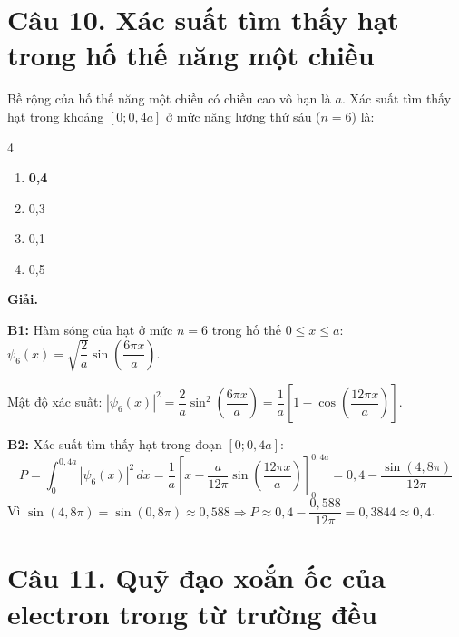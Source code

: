 \documentclass[11pt,a4paper]{article}
\begin{document}
\vspace{0.5cm}

\section*{Câu 10. Xác suất tìm thấy hạt trong hố thế năng một chiều}

Bề rộng của hố thế năng một chiều có chiều cao vô hạn là $a$. Xác suất tìm thấy hạt trong khoảng $[0; 0{,}4a]$ ở mức năng lượng thứ sáu ($n = 6$) là:

\begin{multicols}{4}
\begin{enumerate}[label=\Alph*., itemsep=1pt, topsep=1pt, parsep=0pt, leftmargin=1.8em]
    \item \textbf{0,4}
    \item 0,3
    \item 0,1
    \item 0,5
\end{enumerate}
\end{multicols}

\textbf{Giải.}

\textbf{B1:} Hàm sóng của hạt ở mức $n = 6$ trong hố thế $0 \le x \le a$: $\psi_6(x) = \sqrt{\dfrac{2}{a}} \sin\!\left(\dfrac{6\pi x}{a}\right)$.

Mật độ xác suất: $|\psi_6(x)|^2 = \dfrac{2}{a} \sin^2\!\left(\dfrac{6\pi x}{a}\right) = \dfrac{1}{a} \left[ 1 - \cos\!\left(\dfrac{12\pi x}{a}\right) \right]$.

\textbf{B2:} Xác suất tìm thấy hạt trong đoạn $[0; 0{,}4a]$:
\begin{equation*}
    P = \int_0^{0{,}4a} |\psi_6(x)|^2 \, dx = \frac{1}{a} \left[ x - \frac{a}{12\pi} \sin\!\left(\frac{12\pi x}{a}\right) \right]_0^{0{,}4a} = 0{,}4 - \frac{\sin(4{,}8\pi)}{12\pi}
\end{equation*}
Vì $\sin(4{,}8\pi) = \sin(0{,}8\pi) \approx 0{,}588 \Longrightarrow P \approx 0{,}4 - \dfrac{0{,}588}{12\pi} = 0{,}3844 \approx 0{,}4$.

\vspace{0.5cm}

\section*{Câu 11. Quỹ đạo xoắn ốc của electron trong từ trường đều}
\end{document}
